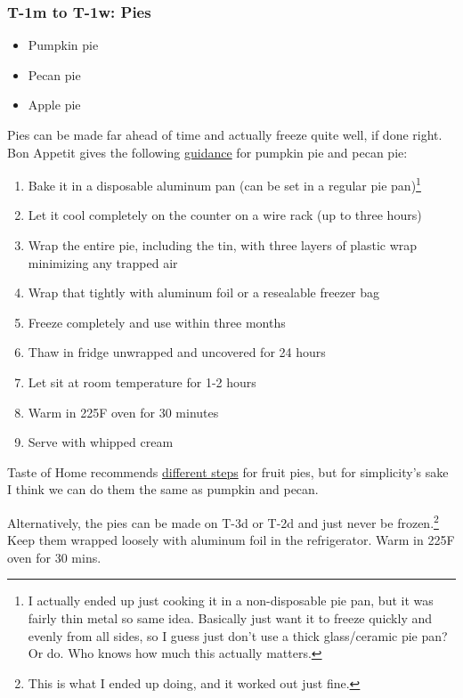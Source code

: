 \documentclass[12pt]{article}
\begin{document}
	\subsubsection{T-1m to T-1w: Pies}
	\begin{itemize}
		\item Pumpkin pie
		\item Pecan pie
		\item Apple pie
	\end{itemize}
	
	Pies can be made far ahead of time and actually freeze quite well, if done right. Bon Appetit gives the following \href{https://www.bonappetit.com/story/can-you-freeze-pumpkin-pie}{guidance} for pumpkin pie and pecan pie:
	\begin{enumerate}
		\item Bake it in a disposable aluminum pan (can be set in a regular pie pan)\footnote{I actually ended up just cooking it in a non-disposable pie pan, but it was fairly thin metal so same idea. Basically just want it to freeze quickly and evenly from all sides, so I guess just don't use a thick glass/ceramic pie pan? Or do. Who knows how much this actually matters.}
		\item Let it cool completely on the counter on a wire rack (up to three hours)
		\item Wrap the entire pie, including the tin, with three layers of plastic wrap minimizing any trapped air
		\item Wrap that tightly with aluminum foil or a resealable freezer bag
		\item Freeze completely and use within three months
		\item Thaw in fridge unwrapped and uncovered for 24 hours
		\item Let sit at room temperature for 1-2 hours
		\item Warm in 225F oven for 30 minutes
		\item Serve with whipped cream
	\end{enumerate}
	
	Taste of Home recommends \href{https://www.tasteofhome.com/article/how-to-freeze-a-pie/}{different steps} for fruit pies, but for simplicity's sake I think we can do them the same as pumpkin and pecan.
	
	Alternatively, the pies can be made on T-3d or T-2d and just never be frozen.\footnote{This is what I ended up doing, and it worked out just fine.} Keep them wrapped loosely with aluminum foil in the refrigerator. Warm in 225F oven for 30 mins.
	
\end{document}
